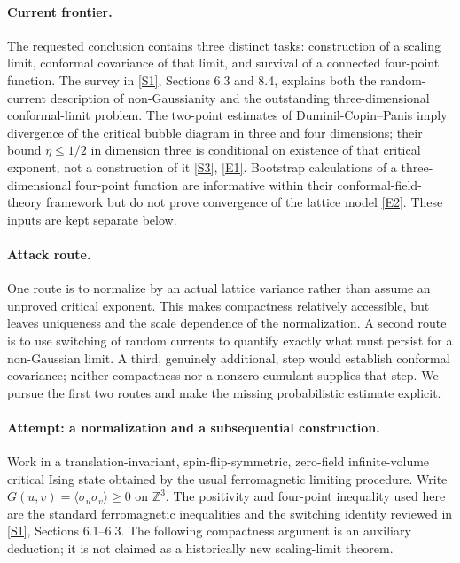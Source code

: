 \documentclass[11pt,a4paper]{article}
\newcommand{\Z}{\mathbb{Z}}
\newcommand{\sref}[2]{\hyperlink{source:#1:#2}{[S#2]}}
\newcommand{\eref}[2]{\hyperlink{extra:#1:#2}{[E#2]}}
\numberwithin{equation}{section}
\begin{document}
\paragraph{Current frontier.}
The requested conclusion contains three distinct tasks: construction of a
scaling limit, conformal covariance of that limit, and survival of a connected
four-point function. The survey in \sref{30006692}{1}, Sections 6.3 and 8.4, explains
both the random-current description of non-Gaussianity and the outstanding
three-dimensional conformal-limit problem. The two-point estimates of
Duminil-Copin--Panis imply divergence of the critical bubble diagram in
three and four dimensions; their bound $\eta\le 1/2$ in dimension three is
conditional on existence of that critical exponent, not a construction of
it \sref{30006692}{3}, \eref{30006692}{1}. Bootstrap calculations of a three-dimensional
four-point function are informative within their conformal-field-theory
framework but do not prove convergence of the lattice model
\eref{30006692}{2}. These inputs are kept separate below.

\paragraph{Attack route.}
One route is to normalize by an actual lattice variance rather than assume
an unproved critical exponent. This makes compactness relatively accessible,
but leaves uniqueness and the scale dependence of the normalization.
A second route is to use switching of random currents to quantify exactly
what must persist for a non-Gaussian limit. A third, genuinely additional,
step would establish conformal covariance; neither compactness nor a
nonzero cumulant supplies that step. We pursue the first two routes and
make the missing probabilistic estimate explicit.

\paragraph{Attempt: a normalization and a subsequential construction.}
Work in a translation-invariant, spin-flip-symmetric, zero-field infinite-volume
critical Ising state obtained by the usual ferromagnetic limiting procedure.
Write $G(u,v)=\langle\sigma_u\sigma_v\rangle\ge0$ on $\Z^3$.
The positivity and four-point inequality used here are the standard
ferromagnetic inequalities and the switching identity reviewed in
\sref{30006692}{1}, Sections 6.1--6.3. The following compactness argument is an
auxiliary deduction; it is not claimed as a historically new scaling-limit
theorem.
\end{document}
